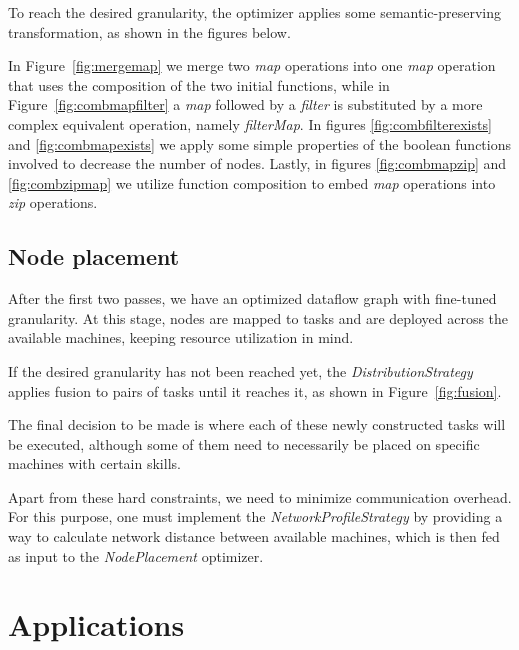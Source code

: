 \documentclass[sigplan,screen]{acmart}
\begin{document}
To reach the desired granularity, the optimizer applies some semantic-preserving
transformation, as shown in the figures below.


In Figure~\ref{fig:mergemap} we merge two \textit{map} operations into
one \textit{map} operation that uses the composition of the two initial
functions, while in Figure~\ref{fig:combmapfilter} a \textit{map} followed
by a \textit{filter} is substituted by a more complex equivalent operation,
namely \textit{filterMap}. In figures \ref{fig:combfilterexists} and
\ref{fig:combmapexists} we apply some simple properties of the boolean functions
involved to decrease the number of nodes. Lastly, in figures \ref{fig:combmapzip} and
\ref{fig:combzipmap} we utilize function composition to embed \textit{map}
operations into \textit{zip} operations.

\subsection{Node placement}

After the first two passes, we have an optimized dataflow graph with fine-tuned
granularity. At this stage, nodes are mapped to tasks and are deployed across
the available machines, keeping resource utilization in mind.

If the desired granularity has not been reached yet, the
\textit{DistributionStrategy} applies fusion to pairs of tasks until it reaches
it, as shown in Figure~\ref{fig:fusion}.


The final decision to be made is where each of these newly constructed tasks
will be executed, although some of them need to necessarily be placed on
specific machines with certain skills.

Apart from these hard constraints, we need to minimize communication overhead.
For this purpose, one must implement the \textit{NetworkProfileStrategy} by providing
a way to calculate network distance between available machines, which is then fed as input
to the \textit{NodePlacement} optimizer.

\section{Applications} \label{sec:applications}
\end{document}

